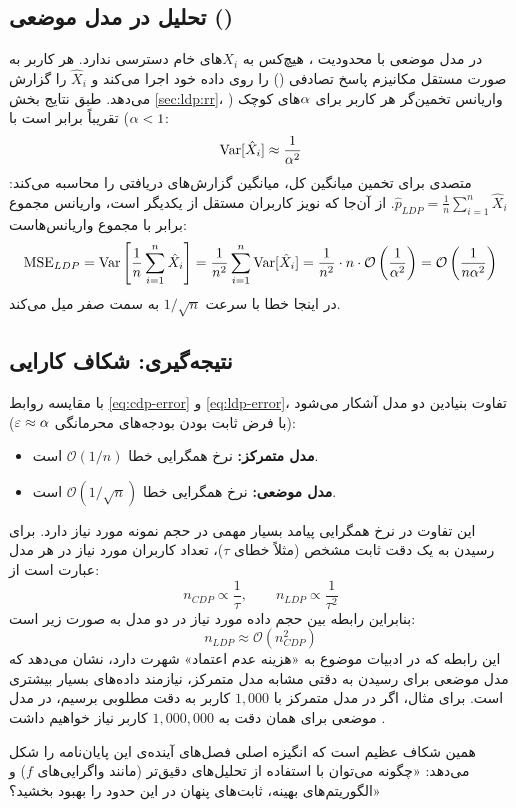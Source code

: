 \subsection{تحلیل در مدل موضعی ()}
در مدل موضعی با محدودیت ، هیچ‌کس به $X_i$های خام دسترسی ندارد. هر کاربر به صورت مستقل مکانیزم پاسخ تصادفی () را روی داده خود اجرا می‌کند و $\hat{X}_i$ را گزارش می‌دهد.
طبق نتایج بخش \ref{sec:ldp:rr}، واریانس تخمین‌گر هر کاربر برای $\alpha$های کوچک ($\alpha < 1$) تقریباً برابر است با:
\begin{equation}
\mathrm{Var}[\hat{X}_i] \approx \frac{1}{\alpha^2}
\end{equation}
متصدی برای تخمین میانگین کل، میانگین گزارش‌های دریافتی را محاسبه می‌کند: $\hat{p}_{LDP} = \frac{1}{n} \sum_{i=1}^n \hat{X}_i$. از آن‌جا که نویز کاربران مستقل از یکدیگر است، واریانس مجموع برابر با مجموع واریانس‌هاست:
\begin{equation}
\label{eq:ldp-error}
\mathrm{MSE}_{LDP} = \mathrm{Var}\left[ \frac{1}{n} \sum_{i=1}^n \hat{X}_i \right] = \frac{1}{n^2} \sum_{i=1}^n \mathrm{Var}[\hat{X}_i] = \frac{1}{n^2} \cdot n \cdot \mathcal{O}\left(\frac{1}{\alpha^2}\right) = \mathcal{O}\left( \frac{1}{n \alpha^2} \right)
\end{equation}
در اینجا خطا با سرعت $1/\sqrt{n}$ به سمت صفر میل می‌کند.

\subsection{نتیجه‌گیری: شکاف کارایی}
با مقایسه روابط \eqref{eq:cdp-error} و \eqref{eq:ldp-error}، تفاوت بنیادین دو مدل آشکار می‌شود (با فرض ثابت بودن بودجه‌های محرمانگی $\varepsilon \approx \alpha$):

\begin{itemize}
    \item \textbf{مدل متمرکز:} نرخ همگرایی خطا $\mathcal{O}(1/n)$ است.
    \item \textbf{مدل موضعی:} نرخ همگرایی خطا $\mathcal{O}(1/\sqrt{n})$ است.
\end{itemize}

این تفاوت در نرخ همگرایی پیامد بسیار مهمی در حجم نمونه مورد نیاز دارد. برای رسیدن به یک دقت ثابت مشخص (مثلاً خطای $\tau$)، تعداد کاربران مورد نیاز در هر مدل عبارت است از:
\begin{equation}
n_{CDP} \propto \frac{1}{\tau}, \qquad n_{LDP} \propto \frac{1}{\tau^2}
\end{equation}
بنابراین رابطه بین حجم داده مورد نیاز در دو مدل به صورت زیر است:
\begin{equation}
n_{LDP} \approx \mathcal{O}(n_{CDP}^2)
\end{equation}
این رابطه که در ادبیات موضوع به «هزینه عدم اعتماد» شهرت دارد، نشان می‌دهد که مدل موضعی برای رسیدن به دقتی مشابه مدل متمرکز، نیازمند داده‌های بسیار بیشتری است. برای مثال، اگر در مدل متمرکز با $1{,}000$ کاربر به دقت مطلوبی برسیم، در مدل موضعی برای همان دقت به $1{,}000{,}000$ کاربر نیاز خواهیم داشت \cite{Duchi2013, kamath2020ldp}.

همین شکاف عظیم است که انگیزه اصلی فصل‌های آینده‌ی این پایان‌نامه را شکل می‌دهد: «چگونه می‌توان با استفاده از تحلیل‌های دقیق‌تر (مانند واگرایی‌های $f$) و الگوریتم‌های بهینه، ثابت‌های پنهان در این حدود را بهبود بخشید؟»